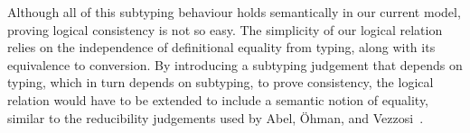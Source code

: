 \documentclass[a4paper,UKenglish,cleveref,autoref,thm-restate]{lipics-v2021}
\newcommand{\citep}[1]{\cite{#1}}
\begin{document}
Although all of this subtyping behaviour holds semantically in our current model,
proving logical consistency is not so easy.
The simplicity of our logical relation relies on
the independence of definitional equality from typing,
along with its equivalence to conversion.
By introducing a subtyping judgement that depends on typing,
which in turn depends on subtyping, to prove consistency,
the logical relation would have to be extended to include a semantic notion of equality,
similar to the reducibility judgements used by Abel, \"Ohman, and Vezzosi~\citep{dec-conv}.



\end{document}
